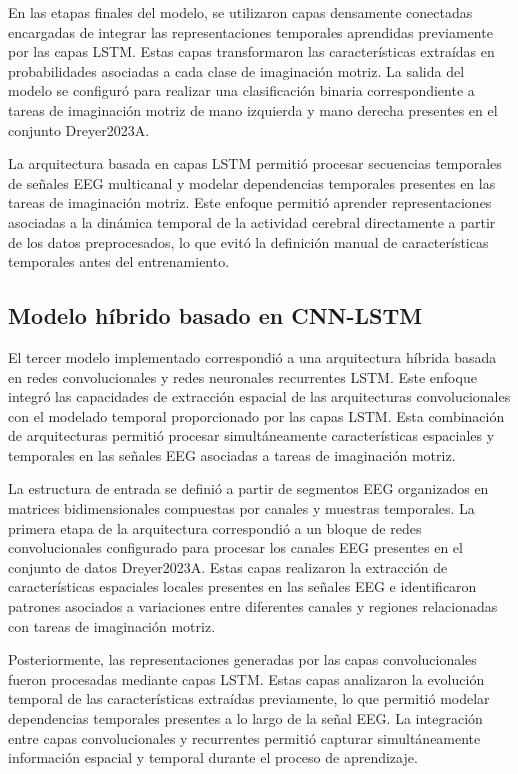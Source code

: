 En las etapas finales del modelo, se utilizaron capas densamente conectadas encargadas de integrar las representaciones temporales aprendidas previamente por las capas LSTM. Estas capas transformaron las características extraídas en probabilidades asociadas a cada clase de imaginación motriz. La salida del modelo se configuró para realizar una clasificación binaria correspondiente a tareas de imaginación motriz de mano izquierda y mano derecha presentes en el conjunto Dreyer2023A.

La arquitectura basada en capas LSTM permitió procesar secuencias temporales de señales EEG multicanal y modelar dependencias temporales presentes en las tareas de imaginación motriz. Este enfoque permitió aprender representaciones asociadas a la dinámica temporal de la actividad cerebral directamente a partir de los datos preprocesados, lo que evitó la definición manual de características temporales antes del entrenamiento.

\subsection{Modelo híbrido basado en CNN-LSTM}

El tercer modelo implementado correspondió a una arquitectura híbrida basada en redes convolucionales y redes neuronales recurrentes LSTM. Este enfoque integró las capacidades de extracción espacial de las arquitecturas convolucionales con el modelado temporal proporcionado por las capas LSTM. Esta combinación de arquitecturas permitió procesar simultáneamente características espaciales y temporales en las señales EEG asociadas a tareas de imaginación motriz.

La estructura de entrada se definió a partir de segmentos EEG organizados en matrices bidimensionales compuestas por canales y muestras temporales. La primera etapa de la arquitectura correspondió a un bloque de redes convolucionales configurado para procesar los canales EEG presentes en el conjunto de datos Dreyer2023A. Estas capas realizaron la extracción de características espaciales locales presentes en las señales EEG e identificaron patrones asociados a variaciones entre diferentes canales y regiones relacionadas con tareas de imaginación motriz.

Posteriormente, las representaciones generadas por las capas convolucionales fueron procesadas mediante capas LSTM. Estas capas analizaron la evolución temporal de las características extraídas previamente, lo que permitió modelar dependencias temporales presentes a lo largo de la señal EEG. La integración entre capas convolucionales y recurrentes permitió capturar simultáneamente información espacial y temporal durante el proceso de aprendizaje.

